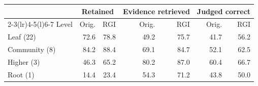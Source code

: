 \begin{tabular}{@{}lrrrrrr@{}}
\toprule
 & \multicolumn{2}{c}{Retained} & \multicolumn{2}{c}{Evidence retrieved} & \multicolumn{2}{c}{Judged correct} \\
\cmidrule(lr){2-3}\cmidrule(lr){4-5}\cmidrule(l){6-7}
Level & Orig. & RGI & Orig. & RGI & Orig. & RGI \\
\midrule
Leaf (22) & 72.6 & 78.8 & 49.2 & 75.7 & 41.7 & 56.2 \\
Community (8) & 84.2 & 88.4 & 69.1 & 84.7 & 52.1 & 62.5 \\
Higher (3) & 46.3 & 65.2 & 80.2 & 87.0 & 60.4 & 66.7 \\
Root (1) & 14.4 & 23.4 & 54.3 & 71.2 & 43.8 & 50.0 \\
\bottomrule
\end{tabular}
